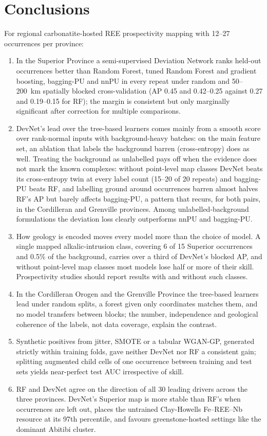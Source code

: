 \documentclass[pdflatex,sn-apa]{sn-jnl}
\begin{document}
\section{Conclusions}\label{sec:conclusions}

For regional carbonatite-hosted REE prospectivity mapping with 12--27 occurrences per province:
\begin{enumerate}
\item In the Superior Province a semi-supervised Deviation Network ranks held-out occurrences better than Random Forest, tuned Random Forest and gradient boosting, bagging-PU and nnPU in every repeat under random and 50--200~km spatially blocked cross-validation (AP 0.45 and 0.42--0.25 against 0.27 and 0.19--0.15 for RF); the margin is consistent but only marginally significant after correction for multiple comparisons.
\item DevNet's lead over the tree-based learners comes mainly from a smooth score over rank-normal inputs with background-heavy batches: on the main feature set, an ablation that labels the background barren (cross-entropy) does as well. Treating the background as unlabelled pays off when the evidence does not mark the known complexes: without point-level map classes DevNet beats its cross-entropy twin at every label count (15--20 of 20 repeats) and bagging-PU beats RF, and labelling ground around occurrences barren almost halves RF's AP but barely affects bagging-PU, a pattern that recurs, for both pairs, in the Cordilleran and Grenville provinces. Among unlabelled-background formulations the deviation loss clearly outperforms nnPU and bagging-PU.
\item How geology is encoded moves every model more than the choice of model. A single mapped alkalic-intrusion class, covering 6 of 15 Superior occurrences and 0.5\% of the background, carries over a third of DevNet's blocked AP, and without point-level map classes most models lose half or more of their skill. Prospectivity studies should report results with and without such classes.
\item In the Cordilleran Orogen and the Grenville Province the tree-based learners lead under random splits, a forest given only coordinates matches them, and no model transfers between blocks; the number, independence and geological coherence of the labels, not data coverage, explain the contrast.
\item Synthetic positives from jitter, SMOTE or a tabular WGAN-GP, generated strictly within training folds, gave neither DevNet nor RF a consistent gain; splitting augmented child cells of one occurrence between training and test sets yields near-perfect test AUC irrespective of skill.
\item RF and DevNet agree on the direction of all 30 leading drivers across the three provinces. DevNet's Superior map is more stable than RF's when occurrences are left out, places the untrained Clay-Howells Fe--REE--Nb resource at its 97th percentile, and favours greenstone-hosted settings like the dominant Abitibi cluster.
\end{enumerate}
\end{document}
